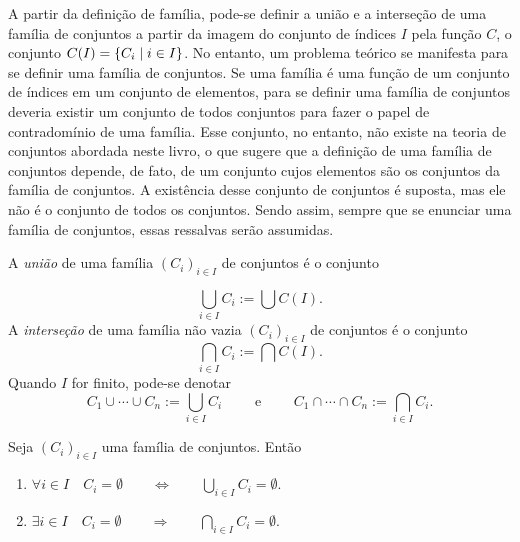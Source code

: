 A partir da definição de família, pode-se definir a união e a interseção de uma família de conjuntos a partir da imagem do conjunto de índices $I$ pela função $C$, o conjunto $C(I) = \left\{{C_i}\;\middle\vert\;{i \in I}\right\}$. No entanto, um problema teórico se manifesta para se definir uma família de conjuntos. Se uma família é uma função de um conjunto de índices em um conjunto de elementos, para se definir uma família de conjuntos deveria existir um conjunto de todos conjuntos para fazer o papel de contradomínio de uma família. Esse conjunto, no entanto, não existe na teoria de conjuntos abordada neste livro, o que sugere que a definição de uma família de conjuntos depende, de fato, de um conjunto cujos elementos são os conjuntos da família de conjuntos. A existência desse conjunto de conjuntos é suposta, mas ele não é o conjunto de todos os conjuntos. Sendo assim, sempre que se enunciar uma família de conjuntos, essas ressalvas serão assumidas.

\begin{definition}
A \emph{união} de uma família $(C_i)_{i \in I}$ de conjuntos é o conjunto
\end{definition}
	\begin{equation*}
	\bigcup_{i \in I} C_i := \bigcup C(I).
	\end{equation*}
A \emph{interseção} de uma família não vazia $(C_i)_{i \in I}$ de conjuntos é o conjunto
	\begin{equation*}
	\bigcap_{i \in I} C_i := \bigcap C(I).
	\end{equation*}
\noindent
Quando $I$ for finito, pode-se denotar
	\begin{equation*}
	C_1 \cup \cdots \cup C_n := \bigcup_{i \in I} C_i \qquad \text{\ \ e\ \ } \qquad C_1 \cap \cdots \cap C_n := \bigcap_{i \in I} C_i.
	\end{equation*}
	
\begin{proposition}
	Seja $(C_i)_{i \in I}$ uma família de conjuntos. Então
	\begin{enumerate}
	\item $\forall i \in I \quad C_i = \emptyset \qquad \Leftrightarrow \qquad \displaystyle \bigcup_{i \in I} C_i = \emptyset$.
	
	\item $\displaystyle \exists i \in I \quad C_i = \emptyset \qquad \Rightarrow \qquad \bigcap_{i \in I} C_i = \emptyset$.
	\end{enumerate}
\end{proposition}

